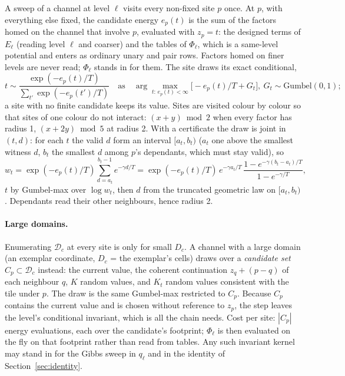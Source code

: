 \documentclass[11pt]{article}
\newcommand{\1}{\mathds{1}}
\newcommand{\Dom}{\mathcal{D}}
\begin{document}
A sweep of a channel at level $\ell$ visits every non-fixed site $p$ once. At $p$, with
everything else fixed, the candidate energy $e_p(t)$ is the sum of the factors homed on the
channel that involve $p$, evaluated with $z_p = t$: the designed terms of $E_\ell$ (reading
level $\ell$ and coarser) and the tables of $\Phi_\ell$, which is a same-level potential and
enters as ordinary unary and pair rows. Factors homed on finer levels are never read; $\Phi_\ell$
stands in for them. The site draws its exact conditional,
\begin{equation}
  t \sim \frac{\exp(-e_p(t)/T)}{\sum_{t'} \exp(-e_p(t')/T)}
  \quad\text{as}\quad
  \arg\max_{t:\, e_p(t) < \infty} \big[-e_p(t)/T + G_t\big],\ G_t \sim \mathrm{Gumbel}(0,1);
\end{equation}
a site with no finite candidate keeps its value. Sites are visited colour by colour so that sites
of one colour do not interact: $(x+y) \bmod 2$ when every factor has radius 1, $(x + 2y) \bmod 5$
at radius 2. With a certificate the draw is joint in $(t, d)$: for each $t$ the valid $d$ form an
interval $[a_t, b_t)$ ($a_t$ one above the smallest witness $d$, $b_t$ the smallest $d$ among
$p$'s dependants, which must stay valid), so
\begin{equation}
  w_t = \exp(-e_p(t)/T) \sum_{d = a_t}^{b_t - 1} e^{-\gamma d / T}
      = \exp(-e_p(t)/T)\, e^{-\gamma a_t/T}\, \frac{1 - e^{-\gamma (b_t - a_t)/T}}{1 - e^{-\gamma/T}},
\end{equation}
$t$ by Gumbel-max over $\log w_t$, then $d$ from the truncated geometric law on $[a_t, b_t)$.
Dependants read their other neighbours, hence radius 2.

\paragraph{Large domains.} Enumerating $\Dom_c$ at every site is only for small $D_c$. A channel
with a large domain (an exemplar coordinate, $D_c$ = the exemplar's cells) draws over a
\emph{candidate set} $C_p \subset \Dom_c$ instead: the current value, the coherent continuation
$z_q + (p - q)$ of each neighbour $q$, $K$ random values, and $K_t$ random values consistent
with the tile under $p$. The draw is the same Gumbel-max restricted to $C_p$. Because $C_p$
contains the current value and is chosen without reference to $z_p$, the step leaves the
level's conditional invariant, which is all the chain needs. Cost per site: $|C_p|$ energy
evaluations, each over the candidate's footprint; $\Phi_\ell$ is then evaluated on the fly on that
footprint rather than read from tables. Any such invariant kernel may stand in for the Gibbs
sweep in $q_\ell$ and in the identity of Section~\ref{sec:identity}.
\end{document}
